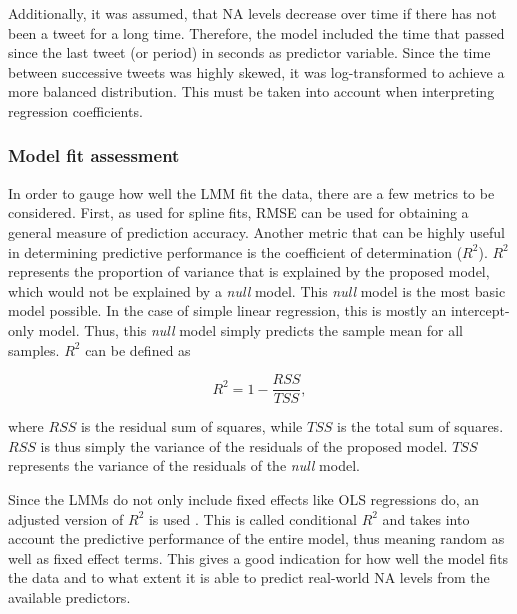 Additionally, it was assumed, that NA levels decrease over time if there has not been a tweet for a long time. Therefore, the model included the time that passed since the last tweet (or period) in seconds as predictor variable.
Since the time between successive tweets was highly skewed, it was log-transformed to achieve a more balanced distribution. This must be taken into account when interpreting regression coefficients.

\subsubsection{Model fit assessment}

In order to gauge how well the LMM fit the data, there are a few metrics to be considered. First, as used for spline fits, RMSE can be used for obtaining a general measure of prediction accuracy. Another metric that can be highly useful in determining predictive performance is the coefficient of determination ($R^2$). $R^2$ represents the proportion of variance that is explained by the proposed model, which would not be explained by a \textit{null} model. This \textit{null} model is the most basic model possible. In the case of simple linear regression, this is mostly an intercept-only model. Thus, this \textit{null} model simply predicts the sample mean for all samples. $R^2$ can be defined as

\begin{equation}
    R^2 = 1 - \frac{RSS}{TSS},
\end{equation}

where $RSS$ is the residual sum of squares, while $TSS$ is the total sum of squares. $RSS$ is thus simply the variance of the residuals of the proposed model. $TSS$ represents the variance of the residuals of the \textit{null} model.

Since the LMMs do not only include fixed effects like OLS regressions do, an adjusted version of $R^2$ is used \citep{nakagawa2013general}. This is called conditional $R^2$ and takes into account the predictive performance of the entire model, thus meaning random as well as fixed effect terms. This gives a good indication for how well the model fits the data and to what extent it is able to predict real-world NA levels from the available predictors.


